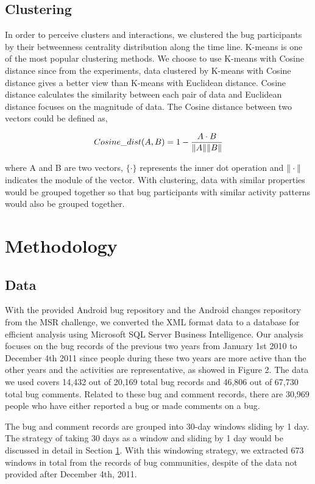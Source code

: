 \documentclass[10pt, conference, compsocconf]{IEEEtran}
\begin{document}
\subsection{Clustering}
In order to perceive clusters and interactions, we clustered the bug participants by their betweenness centrality distribution along the time line. K-means is one of the most popular clustering methods. We choose to use K-means with Cosine distance since from the experiments, data clustered by K-means with Cosine distance gives a better view than K-means with Euclidean distance. Cosine distance calculates the similarity between each pair of data and Euclidean distance focuses on the magnitude of data. The Cosine distance between two vectors could be defined as,

\begin{equation}
Cosine\_dist(A,B) = 1-\frac{A\cdot B}{\Arrowvert A \Arrowvert \Arrowvert B \Arrowvert}
\end{equation}

where A and B are two vectors, $\{\cdot\}$ represents the inner dot operation and $\Arrowvert \cdot \Arrowvert$ indicates the module of the vector. With clustering, data with similar properties would be grouped together so that bug participants with similar activity patterns would also be grouped together. 

\section{Methodology}
\label{methodology}
\subsection{Data}
With the provided Android bug repository and the Android changes repository from the MSR challenge, we converted the XML format data to a database for efficient analysis using Microsoft SQL Server Business Intelligence. Our analysis focuses on the bug records of the previous two years from January 1st 2010 to December 4th 2011 since people during these two years are more active than the other years and the activities are representative, as showed in Figure 2. The data we used covers 14,432 out of 20,169 total bug records and 46,806 out of 67,730 total bug comments. Related to these bug and comment records, there are 30,969 people who have either reported a bug or made comments on a bug.

The bug and comment records are grouped into 30-day windows sliding by 1 day. The strategy of taking 30 days as a window and sliding by 1 day would be discussed in detail in Section \ref{methodology}. With this windowing strategy, we extracted 673 windows in total from the records of bug communities, despite of the data not provided after December 4th, 2011.
\end{document}
